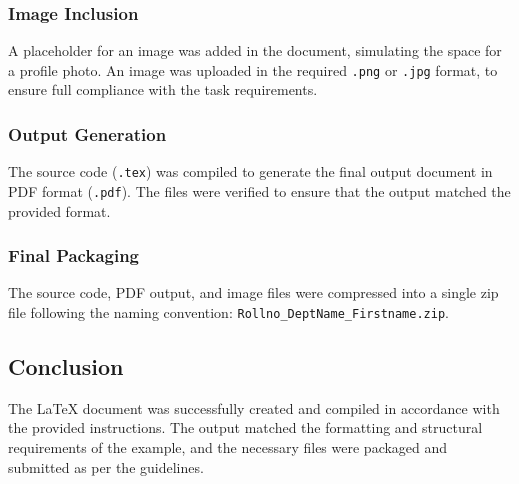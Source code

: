 \subsubsection{Image Inclusion}
A placeholder for an image was added in the document, simulating the space for a profile photo. An image was uploaded in the required \texttt{.png} or \texttt{.jpg} format, to ensure full compliance with the task requirements.

\subsubsection{Output Generation}
The source code (\texttt{.tex}) was compiled to generate the final output document in PDF format (\texttt{.pdf}). The files were verified to ensure that the output matched the provided format.

\subsubsection{Final Packaging}
The source code, PDF output, and image files were compressed into a single zip file following the naming convention: \texttt{Rollno\_DeptName\_Firstname.zip}.

\subsection{Conclusion}
The LaTeX document was successfully created and compiled in accordance with the provided instructions. The output matched the formatting and structural requirements of the example, and the necessary files were packaged and submitted as per the guidelines.
